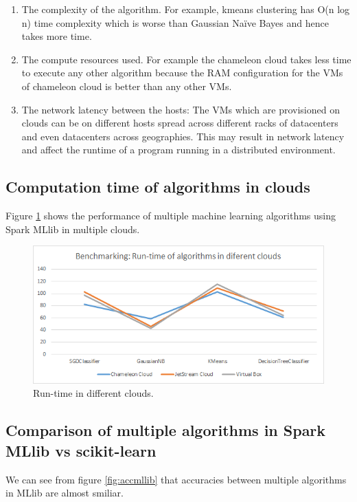 \documentclass[9pt,twocolumn,twoside]{../../styles/osajnl}
\begin{document}
\begin{enumerate}
 \item The complexity of the algorithm. For example,  kmeans clustering has  O(n log n) time complexity which is worse than Gaussian Naïve Bayes and hence takes more time.
 \item The compute resources used.  For example the chameleon cloud takes less time to execute any other algorithm because the RAM configuration for the VMs of chameleon cloud is better than any other VMs.
 \item The network latency between the hosts: The VMs which are provisioned on clouds can be on different hosts spread across different racks of datacenters and even datacenters across geographies. This may result in network latency and affect the runtime of a program running in a distributed environment.
\end{enumerate}

\subsection{Computation time of algorithms in clouds}
Figure \ref{fig:bench} shows the performance of multiple machine learning algorithms using Spark MLlib in multiple clouds.
\begin{figure}[h]
\centering
\includegraphics[scale=0.85]{images/Benchmarking}
\caption{Run-time in different clouds.}
\label{fig:bench}
\end{figure}

\subsection{Comparison of multiple algorithms in Spark MLlib vs scikit-learn}

We can see from figure \ref{fig:accmllib} that accuracies between multiple algorithms in MLlib are almost smiliar. 
\end{document}
